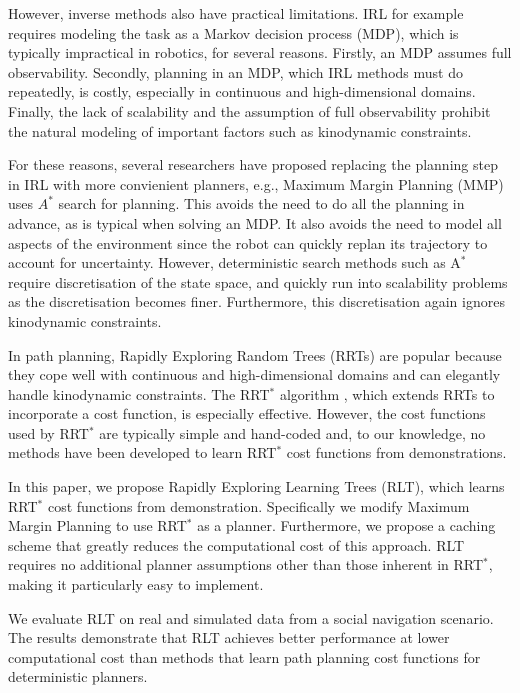 \documentclass{article}  %
\begin{document}
However, inverse methods also have practical limitations. IRL for example requires modeling the task as a Markov decision process (MDP), which is typically impractical in robotics, for several reasons.  Firstly, an MDP assumes full observability. Secondly, planning in an MDP, which IRL methods must do repeatedly, is costly, especially in continuous and high-dimensional domains. Finally, the lack of scalability and the assumption of full observability prohibit the natural modeling of important factors such as kinodynamic constraints. 

For these reasons, several researchers have proposed replacing the planning step in IRL with more convienient planners, e.g., Maximum Margin Planning (MMP) \cite{ratliff2006maximum} uses $A^*$ search for planning. This avoids the need to do all the planning in advance, as is typical when solving an MDP. It also avoids the need to model all aspects of the environment since the robot can quickly replan its trajectory to account for uncertainty. However, deterministic search methods such as A$^*$ require discretisation of the state space, and quickly run into scalability problems as the discretisation becomes finer. Furthermore, this discretisation again ignores kinodynamic constraints.

In path planning, Rapidly Exploring Random Trees (RRTs) \cite{lavalle1998rapidly} are popular because they cope well with continuous and high-dimensional domains and can elegantly handle kinodynamic constraints. The RRT$^*$ algorithm \cite{karaman2011sampling}, which extends RRTs to incorporate a cost function, is especially effective. However, the cost functions used by RRT$^*$ are typically simple and hand-coded and, to our knowledge, no methods have been developed to learn RRT$^*$ cost functions from demonstrations.

In this paper, we propose Rapidly Exploring Learning Trees (RLT), which learns RRT$^*$ cost functions from demonstration. Specifically we modify Maximum Margin Planning to use RRT$^*$ as a planner. Furthermore, we propose a caching scheme that greatly reduces the computational cost of this approach. RLT requires no additional planner assumptions other than those inherent in RRT$^*$, making it particularly easy to implement. 

We evaluate RLT on real and simulated data from a social navigation scenario. The results demonstrate that RLT achieves better performance at lower computational cost than methods that learn path planning cost functions for deterministic planners.
\end{document}
